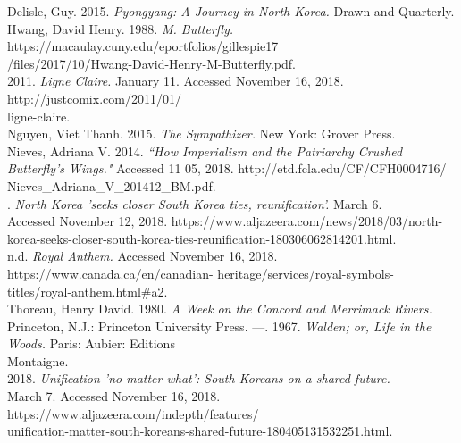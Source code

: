 \documentclass{article}
\begin{document}
Delisle, Guy. 2015. \textit{Pyongyang: A Journey in North Korea.} Drawn and \hspace*{2cm} Quarterly.\\

Hwang, David Henry. 1988. \textit {M. Butterfly.} https://macaulay.cuny.edu/eportfolios/gillespie17 \\
\hspace*{2cm} /files/2017/10/Hwang-David-Henry-M-Butterfly.pdf. \\

2011. \textit{Ligne Claire.} January 11. Accessed November 16, 2018. http://justcomix.com/2011/01/ \\ \hspace*{2cm} ligne-claire. \\

Nguyen, Viet Thanh. 2015. \textit{The Sympathizer.} New York: Grover Press. \\

\newline Nieves, Adriana V. 2014. \textit{“How Imperialism and the Patriarchy Crushed
\newline 
\hspace*{2cm} Butterfly's Wings."} Accessed 11 05, 2018. http://etd.fcla.edu/CF/CFH0004716/ \\
\hspace*{2cm}Nieves\_Adriana\_V\_201412\_BM.pdf. \\

. \textit{North Korea 'seeks closer South Korea ties, reunification'.} March 6. \\
\hspace*{2cm} Accessed November 12, 2018. https://www.aljazeera.com/news/2018/03/north- 
\hspace*{2cm}korea-seeks-closer-south-korea-ties-reunification-180306062814201.html.\\

n.d. \textit{Royal Anthem.} Accessed November 16, 2018. https://www.canada.ca/en/canadian- 
\hspace*{2cm}heritage/services/royal-symbols-titles/royal-anthem.html#a2.\\

Thoreau, Henry David. 1980. \textit{A Week on the Concord and Merrimack \hspace*{2cm} Rivers.} Princeton, N.J.: Princeton University Press.
\newline \hspace*{2cm} —. 1967. \textit{Walden; or, Life in the Woods.} Paris: Aubier: Editions \\ \hspace*{2cm} Montaigne.
 \\

2018. \textit{Unification 'no matter what': South Koreans on a shared future.} \\ \hspace*{2cm} March 7. Accessed November 16, 2018. https://www.aljazeera.com/indepth/features/ \\
\hspace*{2cm}unification-matter-south-koreans-shared-future-180405131532251.html.
\end{document}
